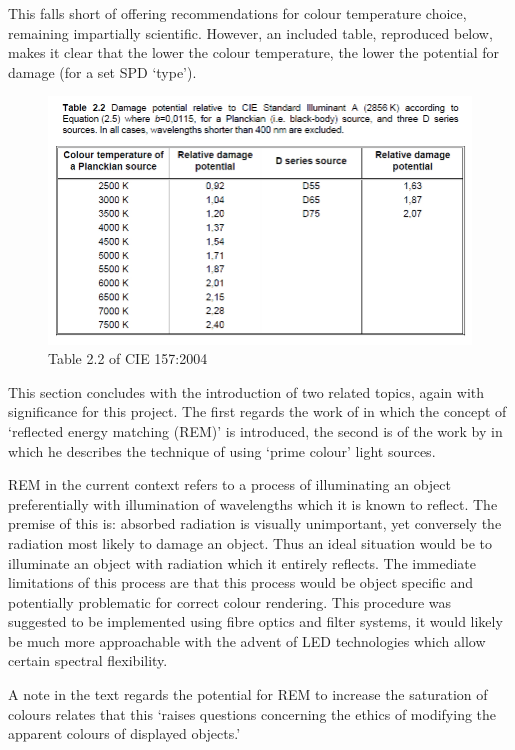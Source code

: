 This falls short of offering recommendations for colour temperature choice, remaining impartially scientific. However, an included table, reproduced below, makes it clear that the lower the colour temperature, the lower the potential for damage (for a set SPD `type').

\begin{figure}[htbp]
\includegraphics[max width=\textwidth]{figs/LitRev/CIE2004b.png}
\caption{Table 2.2 of \gls{CIE} 157:2004 \citep{cie_cie_2004}}
\label{fig:CIE2004b}
\end{figure}

This section concludes with the introduction of two related topics, again with significance for this project. The first regards the work of \citet{miller_evaluating_1993} in which the concept of `reflected energy matching (REM)' is introduced, the second is of the work by \citet{thornton_high_1975} in which he describes the technique of using `prime colour' light sources.

REM in the current context refers to a process of illuminating an object preferentially with illumination of wavelengths which it is known to reflect. The premise of this is: absorbed radiation is visually unimportant, yet conversely the radiation most likely to damage an object. Thus an ideal situation would be to illuminate an object with radiation which it entirely reflects. The immediate limitations of this process are that this process would be object specific and potentially problematic for correct colour rendering. This procedure was suggested to be implemented using fibre optics and filter systems, it would likely be much more approachable with the advent of LED technologies which allow certain spectral flexibility.

A note in the text regards the potential for REM to increase the saturation of colours relates that this `raises questions concerning the ethics of modifying the apparent colours of displayed objects.' 

